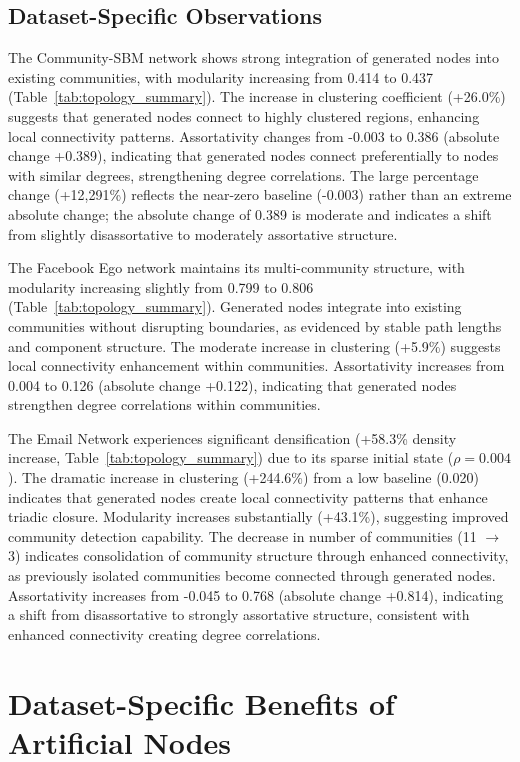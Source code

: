 \documentclass[12pt]{article}
\begin{document}
\subsection{Dataset-Specific Observations}

The Community-SBM network shows strong integration of generated nodes into existing communities, with modularity increasing from 0.414 to 0.437 (Table~\ref{tab:topology_summary}). The increase in clustering coefficient (+26.0\%) suggests that generated nodes connect to highly clustered regions, enhancing local connectivity patterns. Assortativity changes from -0.003 to 0.386 (absolute change +0.389), indicating that generated nodes connect preferentially to nodes with similar degrees, strengthening degree correlations. The large percentage change (+12,291\%) reflects the near-zero baseline (-0.003) rather than an extreme absolute change; the absolute change of 0.389 is moderate and indicates a shift from slightly disassortative to moderately assortative structure.

The Facebook Ego network maintains its multi-community structure, with modularity increasing slightly from 0.799 to 0.806 (Table~\ref{tab:topology_summary}). Generated nodes integrate into existing communities without disrupting boundaries, as evidenced by stable path lengths and component structure. The moderate increase in clustering (+5.9\%) suggests local connectivity enhancement within communities. Assortativity increases from 0.004 to 0.126 (absolute change +0.122), indicating that generated nodes strengthen degree correlations within communities.

The Email Network experiences significant densification (+58.3\% density increase, Table~\ref{tab:topology_summary}) due to its sparse initial state ($\rho = 0.004$). The dramatic increase in clustering (+244.6\%) from a low baseline (0.020) indicates that generated nodes create local connectivity patterns that enhance triadic closure. Modularity increases substantially (+43.1\%), suggesting improved community detection capability. The decrease in number of communities (11 $\rightarrow$ 3) indicates consolidation of community structure through enhanced connectivity, as previously isolated communities become connected through generated nodes. Assortativity increases from -0.045 to 0.768 (absolute change +0.814), indicating a shift from disassortative to strongly assortative structure, consistent with enhanced connectivity creating degree correlations.

\section{Dataset-Specific Benefits of Artificial Nodes}
\end{document}
